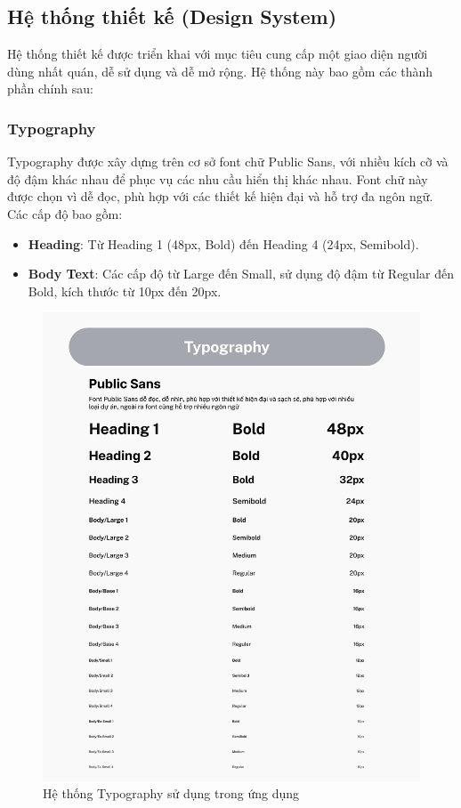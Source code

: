 \subsection*{Hệ thống thiết kế (Design System)}

Hệ thống thiết kế được triển khai với mục tiêu cung cấp một giao diện người dùng nhất quán, dễ sử dụng và dễ mở rộng. Hệ thống này bao gồm các thành phần chính sau:

\subsubsection*{Typography}
Typography được xây dựng trên cơ sở font chữ Public Sans, với nhiều kích cỡ và độ đậm khác nhau để phục vụ các nhu cầu hiển thị khác nhau. Font chữ này được chọn vì dễ đọc, phù hợp với các thiết kế hiện đại và hỗ trợ đa ngôn ngữ. Các cấp độ bao gồm:

\begin{itemize}
    \item \textbf{Heading}: Từ Heading 1 (48px, Bold) đến Heading 4 (24px, Semibold).
    \item \textbf{Body Text}: Các cấp độ từ Large đến Small, sử dụng độ đậm từ Regular đến Bold, kích thước từ 10px đến 20px.
\end{itemize}

\begin{figure}[H]
    \centering
    \includegraphics[scale=0.3]{Images/Implement/Typography.png}
    \caption{Hệ thống Typography sử dụng trong ứng dụng}
\end{figure}

